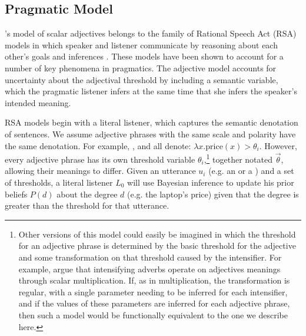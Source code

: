 \begin{appendices}



\section{Pragmatic Model \label{app:model}}

\citet{lassiter_context_2013}'s model of scalar adjectives belongs to the family of Rational Speech Act (RSA) models in which speaker and listener communicate by  reasoning about each other's goals and inferences %
\citep{frank_predicting_2012, goodman_knowledge_2013, franke_quantity_2011, russell_probabilistic_2012}.
These models have been shown to account for a number of key phenomena in pragmatics. The adjective model accounts for uncertainty about the adjectival threshold by including a semantic variable, which the pragmatic listener infers at the same time that she infers the speaker's intended meaning. 

RSA models begin with a literal listener, which captures the semantic denotation of sentences. 
We assume adjective phrases with the same scale and polarity have the same denotation. For example, ,  and  all denote: $\lambda x . \text{price}(x) > \theta_i$. %
However, every adjective phrase has its own threshold variable $\theta_i$,\footnote{%
%
Other versions of this model could easily be imagined in which the threshold for an adjective phrase is determined by the basic threshold for the adjective and some transformation on that threshold caused by the intensifier. 
For example, \cite{cliff1959adverbs} argue that intensifying adverbs operate on adjectives meanings through scalar multiplication.
If, as in multiplication, the transformation is regular, with a single parameter needing to be inferred for each intensifier, and if the values of these parameters are inferred for each adjective phrase, then such a model would be functionally equivalent to the one we describe here.%
%
} together notated $\vec{\theta}$, allowing their meanings to differ.
Given an utterance $u_i$ (e.g. an  or a ) and a set of thresholds, a literal listener $L_0$ will use Bayesian inference to update his prior beliefs $P(d)$ about the degree $d$ (e.g. the laptop's price) given that the degree is greater than the threshold for that utterance.


\end{appendices}
